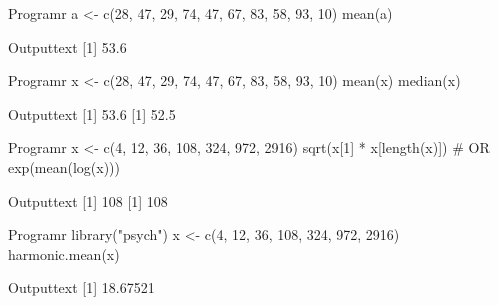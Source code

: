 
\begin{code}
    {Program}{r}
a <- c(28, 47, 29, 74, 47, 67, 83, 58, 93, 10)
mean(a)
\end{code}
\begin{code}
    {Output}{text}
[1] 53.6
\end{code}

\begin{code}
    {Program}{r}
x <- c(28, 47, 29, 74, 47, 67, 83, 58, 93, 10)
mean(x)
median(x)
\end{code}
\begin{code}
    {Output}{text}
[1] 53.6
[1] 52.5
\end{code}

\begin{code}
    {Program}{r}
x <- c(4, 12, 36, 108, 324, 972, 2916)
sqrt(x[1] * x[length(x)])
# OR
exp(mean(log(x)))
\end{code}
\begin{code}
    {Output}{text}
[1] 108
[1] 108
\end{code}

\begin{code}
    {Program}{r}
library("psych")
x <- c(4, 12, 36, 108, 324, 972, 2916)
harmonic.mean(x)
\end{code}
\begin{code}
    {Output}{text}
[1] 18.67521
\end{code}
\newpage

